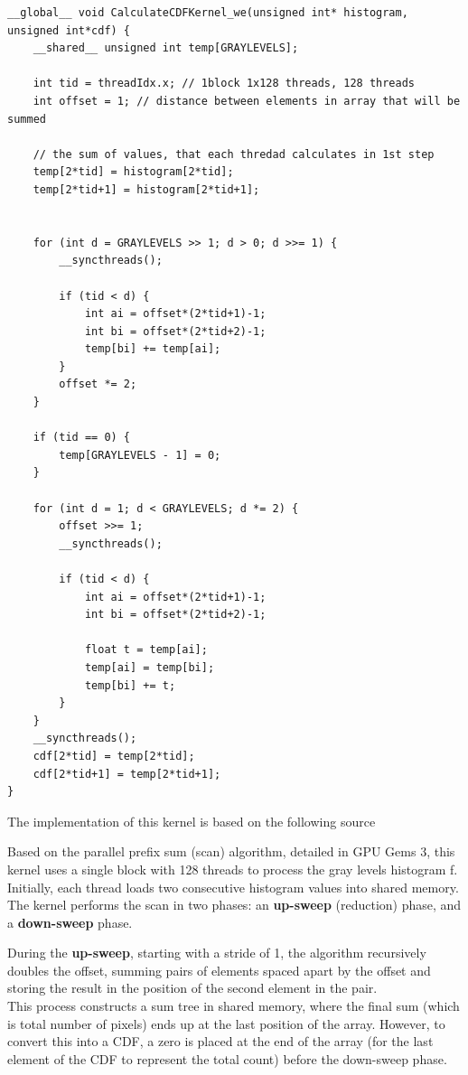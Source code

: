 \documentclass[10pt]{article}
\begin{document}
\begin{lstlisting}[style=cppstyle]
__global__ void CalculateCDFKernel_we(unsigned int* histogram, unsigned int*cdf) {
    __shared__ unsigned int temp[GRAYLEVELS];

    int tid = threadIdx.x; // 1block 1x128 threads, 128 threads 
    int offset = 1; // distance between elements in array that will be summed

    // the sum of values, that each thredad calculates in 1st step
    temp[2*tid] = histogram[2*tid];
    temp[2*tid+1] = histogram[2*tid+1];


    for (int d = GRAYLEVELS >> 1; d > 0; d >>= 1) {
        __syncthreads();

        if (tid < d) {
            int ai = offset*(2*tid+1)-1;
            int bi = offset*(2*tid+2)-1;
            temp[bi] += temp[ai];
        }
        offset *= 2;
    }

    if (tid == 0) {
        temp[GRAYLEVELS - 1] = 0;
    }
    
    for (int d = 1; d < GRAYLEVELS; d *= 2) {
        offset >>= 1;
        __syncthreads();

        if (tid < d) {
            int ai = offset*(2*tid+1)-1;
            int bi = offset*(2*tid+2)-1;

            float t = temp[ai];
            temp[ai] = temp[bi];
            temp[bi] += t;
        }
    }
    __syncthreads();
    cdf[2*tid] = temp[2*tid];
    cdf[2*tid+1] = temp[2*tid+1];
}
\end{lstlisting}
\vspace{1cm}
The implementation of this kernel is based on the following source

Based on the parallel prefix sum (scan) algorithm, detailed in GPU Gems 3\cite{GPU_Gems_3}, this kernel uses a single block with 128 threads to process the gray levels histogram f. Initially, each thread loads two consecutive histogram values into shared memory.\\
The kernel performs the scan in two phases: an \textbf{up-sweep} (reduction) phase, and a \textbf{down-sweep} phase.

\pagebreak

During the \textbf{up-sweep}, starting with a stride of 1, the algorithm recursively doubles the offset, summing pairs of elements spaced apart by the offset and storing the result in the position of the second element in the pair.\\ 
This process constructs a sum tree in shared memory, where the final sum (which is total number of pixels) ends up at the last position of the array. However, to convert this into a CDF, a zero is placed at the end of the array (for the last element of the CDF to represent the total count) before the down-sweep phase.\\
\end{document}
